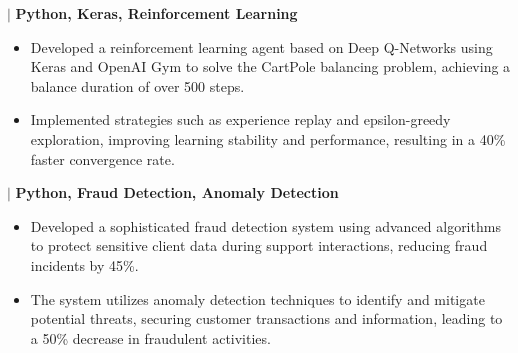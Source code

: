 \documentclass{article}
\begin{document}
 $\mid$ \textbf{Python, Keras, Reinforcement Learning}
\begin{itemize}[noitemsep,nolistsep,leftmargin=*]
    \item Developed a reinforcement learning agent based on Deep Q-Networks using Keras and OpenAI Gym to solve the CartPole balancing problem, achieving a balance duration of over 500 steps.
    \item Implemented strategies such as experience replay and epsilon-greedy exploration, improving learning stability and performance, resulting in a 40\% faster convergence rate.
\end{itemize}

 $\mid$ \textbf{Python, Fraud Detection, Anomaly Detection}
\begin{itemize}[noitemsep,nolistsep,leftmargin=*]
    \item Developed a sophisticated fraud detection system using advanced algorithms to protect sensitive client data during support interactions, reducing fraud incidents by 45\%.
    \item The system utilizes anomaly detection techniques to identify and mitigate potential threats, securing customer transactions and information, leading to a 50\% decrease in fraudulent activities.
\end{itemize}
\end{document}
